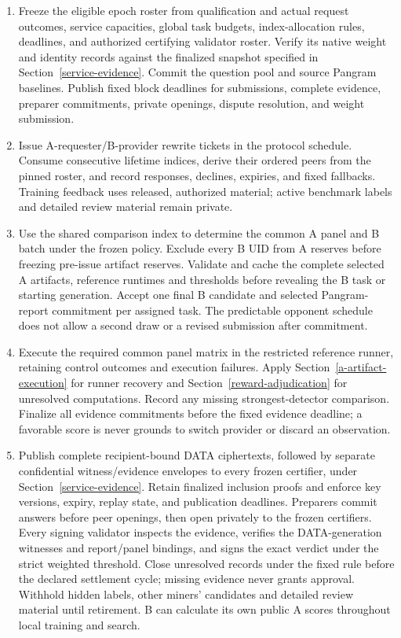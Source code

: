 \begin{enumerate}
\def\labelenumi{\arabic{enumi}.}
\tightlist
\item
  Freeze the eligible epoch roster from qualification and actual request
  outcomes, service capacities, global task budgets, index-allocation
  rules, deadlines, and authorized certifying validator roster. Verify its
  native weight and identity records against the finalized snapshot
  specified in Section~\ref{service-evidence}. Commit the question
  pool and source Pangram baselines. Publish fixed block deadlines for
  submissions, complete evidence, preparer commitments, private openings,
  dispute resolution, and weight submission.
\item
  Issue A-requester/B-provider rewrite tickets in the protocol schedule. Consume
  consecutive lifetime indices, derive their ordered peers from the
  pinned roster, and record responses, declines, expiries, and fixed
  fallbacks. Training feedback uses released, authorized material;
  active benchmark labels and detailed review material remain private.
\item
  Use the shared comparison index to determine the common A panel and B
  batch under the frozen policy. Exclude every B UID from A reserves
  before freezing pre-issue artifact reserves. Validate and cache the
  complete selected A artifacts, reference runtimes and thresholds
  before revealing the B task or starting generation. Accept one final B candidate and selected
  Pangram-report commitment per assigned task. The predictable opponent
  schedule does not allow a second draw or a revised submission after
  commitment.
\item
  Execute the required common panel matrix in the restricted reference
  runner, retaining control outcomes and execution failures. Apply
  Section~\ref{a-artifact-execution} for runner recovery and
  Section~\ref{reward-adjudication} for unresolved computations.
  Record any missing strongest-detector comparison. Finalize all evidence commitments before
  the fixed evidence deadline; a favorable score is never grounds to
  switch provider or discard an observation.
\item
  Publish complete recipient-bound DATA ciphertexts, followed by separate
  confidential witness/evidence envelopes to every frozen certifier, under
  Section~\ref{service-evidence}. Retain finalized inclusion proofs and
  enforce key versions, expiry, replay state, and publication deadlines.
  Preparers commit answers before peer openings, then open privately to
  the frozen certifiers. Every signing validator inspects the evidence,
  verifies the DATA-generation witnesses and report/panel bindings, and
  signs the exact verdict under the strict weighted threshold. Close
  unresolved records under the fixed rule before the declared settlement
  cycle; missing evidence never grants approval.
  Withhold hidden labels, other miners' candidates and detailed review
  material until retirement. B can calculate its own public A scores
  throughout local training and search.
\end{enumerate}

